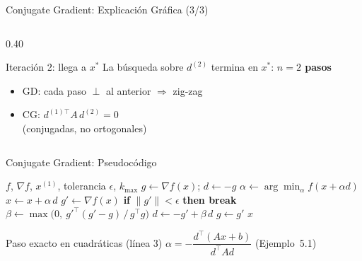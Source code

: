\begin{frame}{Conjugate Gradient: Explicación Gráfica (3/3)}
\begin{columns}[T]
\begin{column}{0.40\textwidth}
\begin{block}{Iteración 2: llega a $x^*$}
                \footnotesize
                La búsqueda sobre $d^{(2)}$ termina en $x^*$:
                \textbf{$n=2$ pasos}
            \end{block}
            \small
            \begin{itemize}
                \item GD: cada paso $\perp$ al anterior $\Rightarrow$ zig-zag
                \item CG: $d^{(1)\top}A\,d^{(2)}=0$\\ (conjugadas, no ortogonales)
            \end{itemize}
        \end{column}
    \end{columns}
\end{frame}

\begin{frame}{Conjugate Gradient: Pseudocódigo}
    \scriptsize
    \begin{algorithmic}[1]
        \Require $f$, $\nabla f$, $x^{(1)}$, tolerancia $\epsilon$, $k_{\max}$
        \State $g \gets \nabla f(x)$; \quad $d \gets -g$ 
            \State $\alpha \gets \arg\min_{\alpha} f(x + \alpha d)$ 
            \State $x \gets x + \alpha\, d$ 
            \State $g' \gets \nabla f(x)$
            \State \textbf{if} $\lVert g' \rVert < \epsilon$ \textbf{then break}
            \State $\beta \gets \max\bigl(0,\ g'^{\top}(g' - g)\,/\,g^{\top} g\bigr)$ 
            \State $d \gets -g' + \beta\, d$ 
            \State $g \gets g'$
        \EndFor
        \State \Return $x$
    \end{algorithmic}

    \vspace{0.8em}
    \begin{block}{Paso exacto en cuadráticas (línea 3)}
        \centering\footnotesize
        $\alpha = -\dfrac{d^\top(Ax+b)}{d^\top A d}$ \qquad (Ejemplo~5.1)
    \end{block}
\end{frame}

